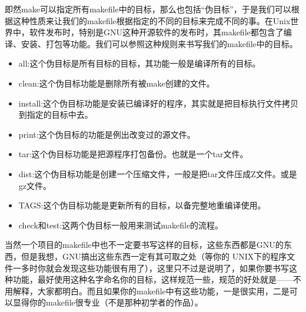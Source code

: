 \documentclass[a4paper,10pt]{sphinxmanual}
\begin{document}
即然make可以指定所有makefile中的目标，那么也包括“伪目标”，于是我们可以根据这种性质来让我们的makefile根据指定的不同的目标来完成不同的事。在Unix世界中，软件发布时，特别是GNU这种开源软件的发布时，其makefile都包含了编译、安装、打包等功能。我们可以参照这种规则来书写我们的makefile中的目标。
\begin{itemize}
\item {} 
all:这个伪目标是所有目标的目标，其功能一般是编译所有的目标。

\item {} 
clean:这个伪目标功能是删除所有被make创建的文件。

\item {} 
install:这个伪目标功能是安装已编译好的程序，其实就是把目标执行文件拷贝到指定的目标中去。

\item {} 
print:这个伪目标的功能是例出改变过的源文件。

\item {} 
tar:这个伪目标功能是把源程序打包备份。也就是一个tar文件。

\item {} 
dist:这个伪目标功能是创建一个压缩文件，一般是把tar文件压成Z文件。或是gz文件。

\item {} 
TAGS:这个伪目标功能是更新所有的目标，以备完整地重编译使用。

\item {} 
check和test:这两个伪目标一般用来测试makefile的流程。

\end{itemize}

当然一个项目的makefile中也不一定要书写这样的目标，这些东西都是GNU的东西，但是我想，GNU搞出这些东西一定有其可取之处（等你的 UNIX下的程序文件一多时你就会发现这些功能很有用了），这里只不过是说明了，如果你要书写这种功能，最好使用这种名字命名你的目标，这样规范一些，规范的好处就是——不用解释，大家都明白。而且如果你的makefile中有这些功能，一是很实用，二是可以显得你的makefile很专业（不是那种初学者的作品）。
\end{document}
